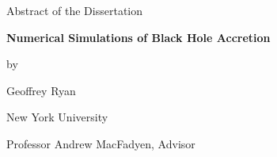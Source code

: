 \documentclass[12pt,letterpaper]{article}
\newcommand{\thesistitle}{Numerical Simulations of Black Hole Accretion}
\newcommand{\thesisauthor}{Geoffrey Ryan}
\newcommand{\thesisadvisor}{Professor Andrew MacFadyen}
\begin{document}
  \begin{center}
    Abstract of the Dissertation\bigskip

    \textbf{\thesistitle}\bigskip

    by\bigskip

    \thesisauthor\bigskip

    New York University\bigskip

    \thesisadvisor, Advisor
  \end{center}
\bigskip


\end{document}
